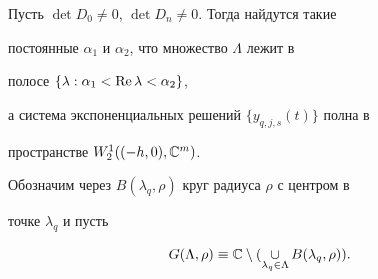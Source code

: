 \begin{lem} 


Пусть $\det D_0\ne0$, $\det D_n\ne0$. Тогда найдутся такие 


постоянные $\alpha_1$ и $\alpha_2$, что множество $\Lambda$ лежит в 


полосе $\{\lambda:\alpha_1<\operatorname{Re}\lambda<\alpha_2\}$, 


а система экспоненциальных решений $\{y_{q,j,s}(t)\}$ полна в 


пространстве $W^1_2((-h,0),\Bbb C^m)$. 


\end{lem} 


 


Обозначим через $B(\lambda_q,\rho)$ круг радиуса $\rho$ с центром в 


точке $\lambda_q$ и пусть


$$


G(\Lambda,\rho)\equiv\Bbb C 


\setminus(\mathop{\cup}\limits_{\lambda_q\in\Lambda} B(\lambda_q,\rho)). 


$$


 


